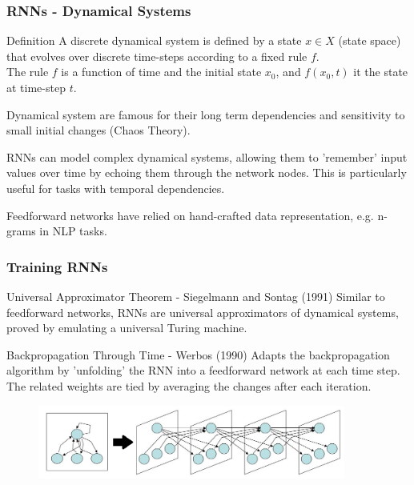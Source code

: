 \documentclass{beamer}
\begin{document}
\begin{frame}
\frametitle{RNNs - Dynamical Systems}
\begin{block}{Definition}
A discrete dynamical system is defined by a state $x \in X$ (state space) that evolves over discrete time-steps according to a fixed rule $f$.\\
The rule $f$ is a function of time and the initial state $x_0$, and $f(x_0, t)$ it the state at time-step $t$.
\end{block}
\vspace{0.8mm}

Dynamical system are famous for their long term dependencies and sensitivity to small initial changes (Chaos Theory).
\vspace{0.9mm}

RNNs can model complex dynamical systems, allowing them to  'remember' input values over time by echoing them through the network nodes. This is particularly useful for tasks with temporal dependencies.
\vspace{0.9mm}

Feedforward networks have relied on hand-crafted data representation, e.g. n-grams in NLP tasks.

\end{frame}


\begin{frame}
\frametitle{Training RNNs}
\begin{block}{Universal Approximator Theorem - Siegelmann and Sontag (1991)}
Similar to feedforward networks, RNNs are universal approximators of dynamical systems, proved by emulating a universal Turing machine.
\end{block}

\begin{block}{Backpropagation Through Time - Werbos (1990)}
 Adapts the backpropagation algorithm by 'unfolding' the RNN into a feedforward network at each time step. The related weights are tied by averaging the changes after each iteration.
\begin{figure}[!htbp]
\centering
\includegraphics[width=0.9\textwidth]{pictures/bptt.png}
\label{fig:bptt}
\end{figure}
\end{block}
\end{frame}
\end{document}
